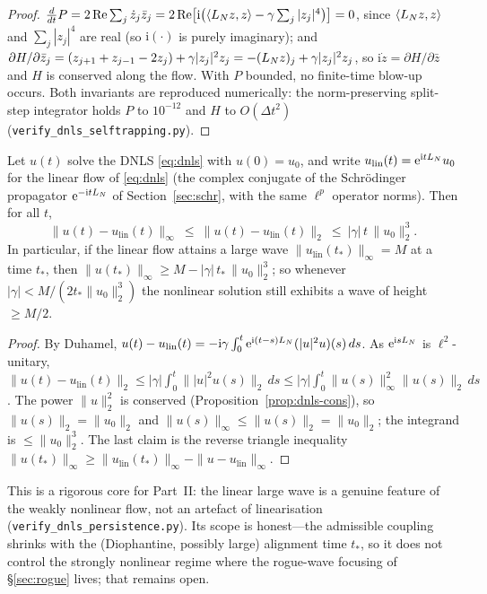 \begin{proof}
$\tfrac{d}{dt}P=2\,\mathrm{Re}\sum_j\dot z_j\bar z_j
 =2\,\mathrm{Re}\bigl[\mathrm i\bigl(\langle L_N z,z\rangle-\gamma\textstyle\sum_j|z_j|^4\bigr)\bigr]=0$,
since $\langle L_N z,z\rangle$ and $\sum_j|z_j|^4$ are real (so $\mathrm i(\cdot)$ is purely imaginary); and
$\partial H/\partial\bar z_j=(z_{j+1}+z_{j-1}-2z_j)+\gamma|z_j|^2z_j=-(L_N z)_j+\gamma|z_j|^2z_j$, so
$\mathrm i\dot z=\partial H/\partial\bar z$ and $H$ is conserved along the flow. With $P$ bounded, no
finite-time blow-up occurs. Both invariants are reproduced numerically: the norm-preserving split-step
integrator holds $P$ to $10^{-12}$ and $H$ to $O(\Delta t^2)$ (\texttt{verify\_dnls\_selftrapping.py}).
\end{proof}

\begin{proposition}\label{prop:dnls-persist}
Let $u(t)$ solve the DNLS \eqref{eq:dnls} with $u(0)=u_0$, and write $u_{\mathrm{lin}}(t)=\mathrm{e}^{\mathrm
i tL_N}u_0$ for the linear flow of \eqref{eq:dnls} (the complex conjugate of the Schr\"odinger propagator
$\mathrm{e}^{-\mathrm itL_N}$ of Section~\ref{sec:schr}, with the same $\ell^p$ operator norms). Then for all $t$,
\[
  \|u(t)-u_{\mathrm{lin}}(t)\|_\infty\ \le\ \|u(t)-u_{\mathrm{lin}}(t)\|_2\ \le\ |\gamma|\,t\,\|u_0\|_2^3 .
\]
In particular, if the linear flow attains a large wave $\|u_{\mathrm{lin}}(t_\ast)\|_\infty=M$ at a time
$t_\ast$, then $\|u(t_\ast)\|_\infty\ge M-|\gamma|\,t_\ast\,\|u_0\|_2^3$; so whenever
$|\gamma|<M/(2t_\ast\|u_0\|_2^3)$ the nonlinear solution still exhibits a wave of height $\ge M/2$.
\end{proposition}

\begin{proof}
By Duhamel, $u(t)-u_{\mathrm{lin}}(t)=-\mathrm i\gamma\int_0^t\mathrm{e}^{\mathrm i(t-s)L_N}(|u|^2u)(s)\,ds$. As
$\mathrm{e}^{\mathrm isL_N}$ is $\ell^2$-unitary, $\|u(t)-u_{\mathrm{lin}}(t)\|_2\le|\gamma|\int_0^t\||u|^2u(s)\|_2\,ds
\le|\gamma|\int_0^t\|u(s)\|_\infty^2\|u(s)\|_2\,ds$. The power $\|u\|_2^2$ is conserved
(Proposition~\ref{prop:dnls-cons}), so $\|u(s)\|_2=\|u_0\|_2$ and $\|u(s)\|_\infty\le\|u(s)\|_2=\|u_0\|_2$;
the integrand is $\le\|u_0\|_2^3$. The last claim is the reverse triangle inequality
$\|u(t_\ast)\|_\infty\ge\|u_{\mathrm{lin}}(t_\ast)\|_\infty-\|u-u_{\mathrm{lin}}\|_\infty$.
\end{proof}

\noindent This is a rigorous core for Part~II: the linear large wave is a genuine feature of the weakly
nonlinear flow, not an artefact of linearisation (\texttt{verify\_dnls\_persistence.py}). Its scope is
honest---the admissible coupling shrinks with the (Diophantine, possibly large) alignment time $t_\ast$, so
it does not control the strongly nonlinear regime where the rogue-wave focusing of \S\ref{sec:rogue} lives;
that remains open.

